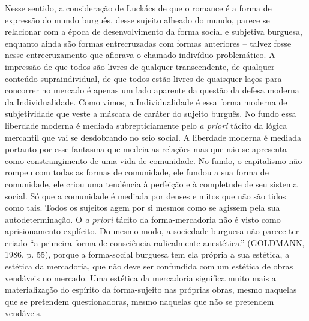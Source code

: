 Nesse sentido, a consideração de Luckács de que o romance é a forma de
expressão do mundo burguês, desse sujeito alheado do mundo, parece se
relacionar com a época de desenvolvimento da forma social e subjetiva
burguesa, enquanto ainda são formas entrecruzadas com formas anteriores
-- talvez fosse nesse entrecruzamento que aflorava o chamado indivíduo
problemático. A impressão de que todos são livres de qualquer
transcendente, de qualquer conteúdo supraindividual, de que todos estão
livres de quaisquer laços para concorrer no mercado é apenas um lado
aparente da questão da defesa moderna da Individualidade. Como vimos, a
Individualidade é essa forma moderna de subjetividade que veste a
máscara de caráter do sujeito burguês. No fundo essa liberdade moderna é
mediada subrepticiamente pelo \emph{a priori} tácito da lógica mercantil
que vai se desdobrando no seio social. A liberdade moderna é mediada
portanto por esse fantasma que medeia as relações mas que não se
apresenta como constrangimento de uma vida de comunidade. No fundo, o
capitalismo não rompeu com todas as formas de comunidade, ele fundou a
sua forma de comunidade, ele criou uma tendência à perfeição e à
completude de seu sistema social. Só que a comunidade é mediada por
deuses e mitos que não são tidos como tais. Todos os sujeitos agem por
si mesmos como se agissem pela sua autodeterminação. O \emph{a priori}
tácito da forma-mercadoria não é visto como aprisionamento explícito. Do
mesmo modo, a sociedade burguesa não parece ter criado ``a primeira
forma de consciência radicalmente anestética.'' (GOLDMANN, 1986, p. 55),
porque a forma-social burguesa tem ela própria a sua estética, a
estética da mercadoria, que não deve ser confundida com um estética de
obras vendáveis no mercado. Uma estética da mercadoria significa muito
mais a materialização do espírito da forma-sujeito nas próprias obras,
mesmo naquelas que se pretendem questionadoras, mesmo naquelas que não
se pretendem vendáveis.

